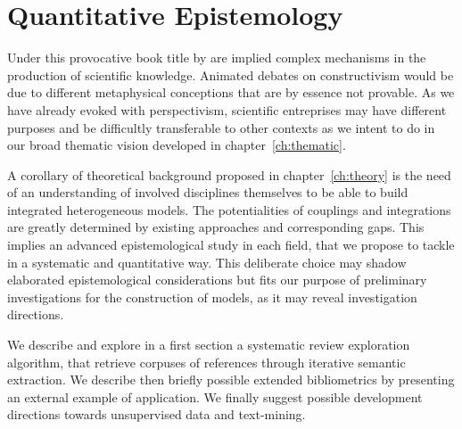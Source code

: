 





\chapter{Quantitative Epistemology} %

\label{ch:quantepistemo} %





\bigskip

Under this provocative book title by  are implied complex mechanisms in the production of scientific knowledge. Animated debates on constructivism would be due to different metaphysical conceptions that are by essence not provable. As we have already evoked with perspectivism, scientific entreprises may have different purposes and be difficultly transferable to other contexts as we intent to do in our broad thematic vision developed in chapter~\ref{ch:thematic}.


A corollary of theoretical background proposed in chapter~\ref{ch:theory} is the need of an understanding of involved disciplines themselves to be able to build integrated heterogeneous models. The potentialities of couplings and integrations are greatly determined by existing approaches and corresponding gaps. This implies an advanced epistemological study in each field, that we propose to tackle in a systematic and quantitative way. This deliberate choice may shadow elaborated epistemological considerations but fits our purpose of preliminary investigations for the construction of models, as it may reveal investigation directions.


We describe and explore in a first section a systematic review exploration algorithm, that retrieve corpuses of references through iterative semantic extraction. We describe then briefly possible extended bibliometrics by presenting an external example of application. We finally suggest possible development directions towards unsupervised data and text-mining.








